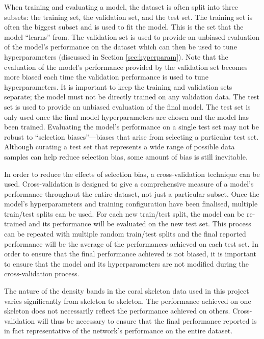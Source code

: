 When training and evaluating a model, the dataset is often split into three subsets: the training set, the validation set, and the test set. The training set is often the biggest subset and is used to fit the model. This is the set that the model ``learns'' from. The validation set is used to provide an unbiased evaluation of the model's performance on the dataset which can then be used to tune hyperparameters (discussed in Section \ref{sec:hyperparam}). Note that the evaluation of the model's performance provided by the validation set becomes more biased each time the validation performance is used to tune hyperparameters. It is important to keep the training and validation sets separate; the model must not be directly trained on any validation data. The test set is used to provide an unbiased evaluation of the final model. The test set is only used once the final model hyperparameters are chosen and the model has been trained. Evaluating the model's performance on a single test set may not be robust to ``selection biases''---biases that arise from selecting a particular test set. Although curating a test set that represents a wide range of possible data samples can help reduce selection bias, some amount of bias is still inevitable.

In order to reduce the effects of selection bias, a cross-validation technique can be used. Cross-validation is designed to give a comprehensive measure of a model's performance throughout the entire dataset, not just a particular subset.  Once the model's hyperparameters and training configuration have been finalised, multiple train/test splits can be used. For each new train/test split, the model can be re-trained and its performance will be evaluated on the new test set. This process can be repeated with multiple random train/test splits and the final reported performance will be the average of the performances achieved on each test set. In order to ensure that the final performance achieved is not biased, it is important to ensure that the model and its hyperparameters are not modified during the cross-validation process.

The nature of the density bands in the coral skeleton data used in this project varies significantly from skeleton to skeleton. The performance achieved on one skeleton does not necessarily reflect the performance achieved on others. Cross-validation will thus be necessary to ensure that the final performance reported is in fact representative of the network's performance on the entire dataset.

